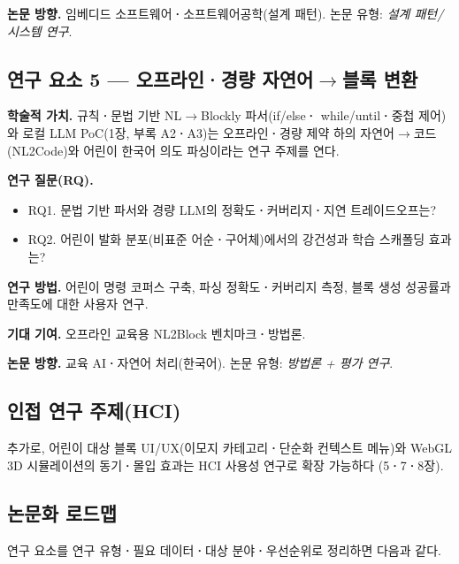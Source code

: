 \noindent\textbf{논문 방향.} 임베디드 소프트웨어\textbf{·}소프트웨어공학(설계 패턴).
논문 유형: \emph{설계 패턴/시스템 연구}.

\subsection{연구 요소 5 --- 오프라인\textbf{·}경량 자연어$\to$블록 변환}

\noindent\textbf{학술적 가치.} 규칙\textbf{·}문법 기반 NL$\to$Blockly 파서(if/else\textbf{·}
while/until\textbf{·}중첩 제어)와 로컬 LLM PoC(1장, 부록 A2\textbf{·}A3)는 오프라인\textbf{·}경량
제약 하의 자연어$\to$코드(NL2Code)와 어린이 한국어 의도 파싱이라는 연구 주제를
연다.

\noindent\textbf{연구 질문(RQ).}
\begin{itemize}
  \item RQ1. 문법 기반 파서와 경량 LLM의 정확도\textbf{·}커버리지\textbf{·}지연 트레이드오프는?
  \item RQ2. 어린이 발화 분포(비표준 어순\textbf{·}구어체)에서의 강건성과 학습 스캐폴딩 효과는?
\end{itemize}

\noindent\textbf{연구 방법.} 어린이 명령 코퍼스 구축, 파싱 정확도\textbf{·}커버리지 측정,
블록 생성 성공률과 만족도에 대한 사용자 연구.

\noindent\textbf{기대 기여.} 오프라인 교육용 NL2Block 벤치마크\textbf{·}방법론.

\noindent\textbf{논문 방향.} 교육 AI\textbf{·}자연어 처리(한국어). 논문 유형:
\emph{방법론 + 평가 연구}.

\subsection{인접 연구 주제(HCI)}

추가로, 어린이 대상 블록 UI/UX(이모지 카테고리\textbf{·}단순화 컨텍스트 메뉴)와
WebGL 3D 시뮬레이션의 동기\textbf{·}몰입 효과는 HCI 사용성 연구로 확장 가능하다
(5\textbf{·}7\textbf{·}8장).

\subsection{논문화 로드맵}

연구 요소를 연구 유형\textbf{·}필요 데이터\textbf{·}대상 분야\textbf{·}우선순위로 정리하면 다음과 같다.

